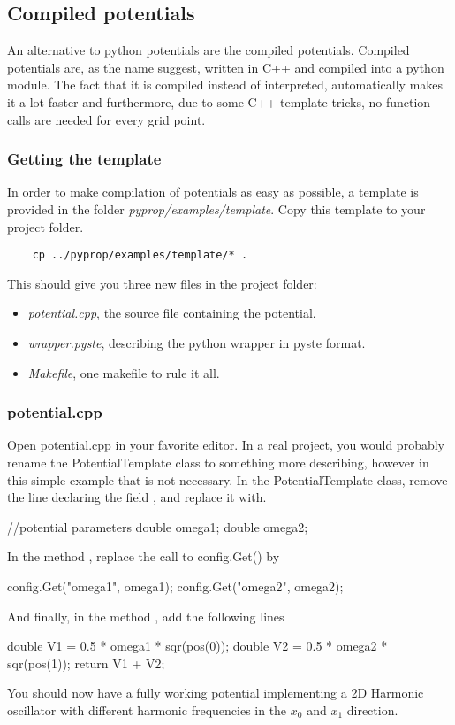 \subsection{Compiled potentials}
An alternative to python potentials are the compiled potentials. Compiled potentials are, as the name suggest, written 
in C++ and compiled into a python module. The fact that it is compiled instead of interpreted, automatically makes it a
lot faster and furthermore, due to some C++ template tricks, no function calls are needed for every grid point. 

\subsubsection*{Getting the template}
In order to make compilation of potentials as easy as possible, a template is provided in the folder 
\textit{pyprop/examples/template}. Copy this template to your project folder.
\begin{verbatim}
	cp ../pyprop/examples/template/* .
\end{verbatim}
This should give you three new files in the project folder: 
\begin{itemize}
	\item \textit{potential.cpp}, the source file containing the potential.
	\item \textit{wrapper.pyste}, describing the python wrapper in pyste format.
	\item \textit{Makefile}, one makefile to rule it all.
\end{itemize}

\subsubsection*{potential.cpp}
Open potential.cpp in your favorite editor. In a real project, you would probably rename the PotentialTemplate
class to something more describing, however in this simple example that is not necessary. 
In the PotentialTemplate class, remove the line declaring the field , and replace it with.
\begin{c++}
	//potential parameters
	double omega1;
	double omega2; 
\end{c++}
In the method , replace the call to config.Get() by
\begin{c++}
	config.Get("omega1", omega1);
	config.Get("omega2", omega2);
\end{c++}
And finally, in the method , add the following lines
\begin{c++}
	double V1 = 0.5 * omega1 * sqr(pos(0));
	double V2 = 0.5 * omega2 * sqr(pos(1));
	return V1 + V2;
\end{c++}
You should now have a fully working potential implementing a 2D Harmonic oscillator with different harmonic frequencies
in the $x_0$ and $x_1$ direction.

